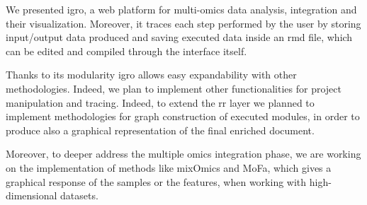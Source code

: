 We presented \gls{igro}, a web platform for multi-omics data analysis, integration and their visualization.
Moreover, it traces each step performed by the user by storing input/output data produced and saving executed data inside an \gls{rmd} file, which can be edited and compiled through the interface itself.

Thanks to its modularity \gls{igro} allows easy expandability with other methodologies.
Indeed, we plan to implement other functionalities for project manipulation and tracing. 
Indeed, to extend the \gls{rr} layer we planned to implement methodologies for graph construction of executed modules, in order to produce also a graphical representation of the final enriched document.

Moreover, to deeper address the multiple omics integration phase, we  are working on the implementation of methods like mixOmics and MoFa, which gives a graphical response of the samples or the features, when working with high-dimensional datasets.